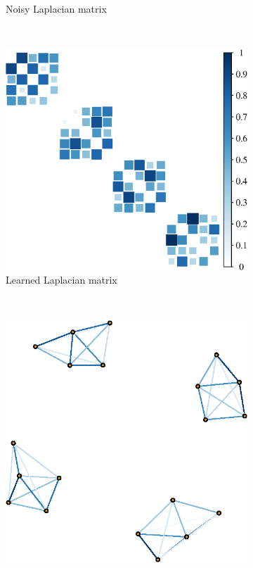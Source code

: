\begin{figure}[!htb]
\begin{subfigure}[b]{0.3\textwidth}
        \caption{Noisy Laplacian matrix}
    \end{subfigure}
    ~ %
    \begin{subfigure}[b]{0.3\textwidth}
        \includegraphics[width=\textwidth]{block-diagonal/est_mat.eps}
        \caption{Learned Laplacian matrix}
    \end{subfigure}
        \\
    \begin{subfigure}[b]{0.3\textwidth}
        \includegraphics[width=\textwidth]{block-diagonal/true_graph.eps}

\end{subfigure}
\end{figure}
